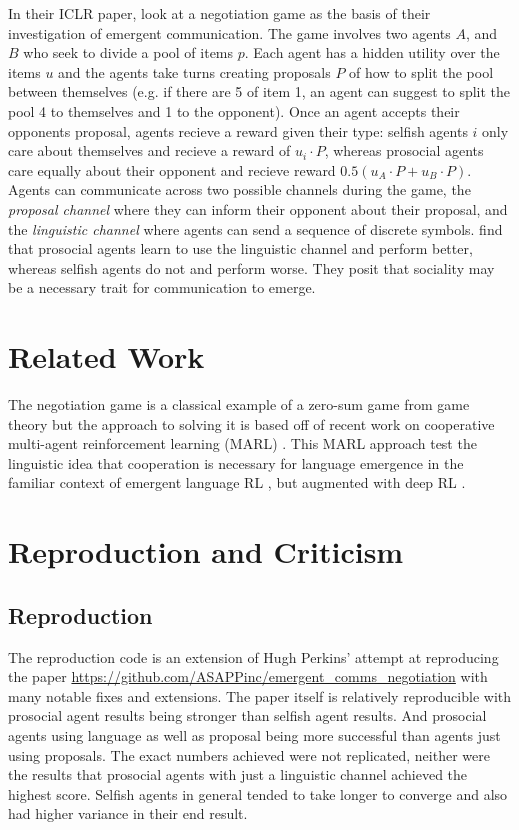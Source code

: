 \documentclass{article}
\begin{document}
In their ICLR paper, \cite{cao2018emergent} look at a negotiation game as the
basis of their investigation of emergent communication. The game involves two
agents $A$, and $B$ who seek to divide a pool of items $p$. Each agent has a
hidden utility over the items $u$ and the agents take turns creating proposals
$P$ of how to split the pool between themselves (e.g. if there are 5 of item 1,
an agent can suggest to split the pool 4 to themselves and 1 to the opponent).
Once an agent accepts their opponents proposal, agents recieve a reward given
their type: selfish agents $i$ only care about themselves and recieve a reward of
$u_i \cdot P$, whereas prosocial agents care equally about their opponent
and recieve reward $0.5 (u_A \cdot P + u_B \cdot P)$. Agents can communicate
across two possible channels during the game, the \textit{proposal channel}
where they can inform their opponent about their proposal, and the
\textit{linguistic channel} where agents can send a sequence of discrete
symbols. \cite{cao2018emergent} find that prosocial agents learn to use the
linguistic channel and perform better, whereas selfish agents do not and perform
worse. They posit that sociality may be a necessary trait for communication to
emerge.

\section{Related Work}%
\label{sec:related_work}

The negotiation game is a classical example of a zero-sum game from game theory
\cite{nash} but the approach to solving it is based off of recent work on
cooperative multi-agent reinforcement learning (MARL) \cite{panait}. This MARL
approach test the linguistic idea that cooperation is necessary for language
emergence \cite{nowak1999evolution} in the familiar context of emergent language
RL \cite{wagner2003progress}, but augmented with deep RL
\cite{laziridou2016multi}.


\section{Reproduction and Criticism}%
\label{sec:reproduction}

\subsection{Reproduction}%
\label{sub:reproduction}
The reproduction code is an extension of Hugh Perkins' attempt at reproducing
the paper \url{https://github.com/ASAPPinc/emergent_comms_negotiation} with
many notable fixes and extensions. The paper itself is relatively reproducible
with prosocial agent results being stronger than selfish agent results. And
prosocial agents using language as well as proposal being more successful than
agents just using proposals. The exact numbers achieved were not replicated,
neither were the results that prosocial agents with just a linguistic channel
achieved the highest score. Selfish agents in general tended to take longer to
converge and also had higher variance in their end result.
\end{document}
